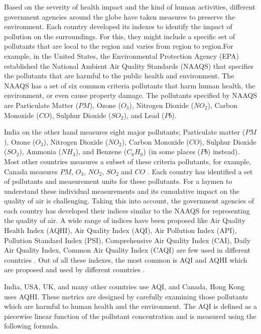 Based on the severity of health impact and the kind of human activities, different government agencies around the globe have taken measures to preserve the environment. Each country developed its indexes to identify the impact of pollution on the surroundings. For this, they might include a specific set of pollutants that are local to the region and varies from region to region.For example, in the United States, the Environmental Protection Agency (EPA) established the National Ambient Air Quality Standards (NAAQS) that specifies the pollutants that are harmful to the public health and environment. The NAAQS has a set of six common criteria pollutants that harm human health, the environment, or even cause property damage. The pollutants specified by NAAQS are Particulate Matter ($PM$), Ozone ($O_3$),  Nitrogen Dioxide ($NO_2$), Carbon Monoxide ($CO$), Sulphur Dioxide ($SO_2$), and Lead ($Pb$).

India on the other hand measures eight major pollutants; Particulate matter ($PM$), Ozone ($O_3$), Nitrogen Dioxide ($NO_2$), Carbon Monoxide ($CO$), Sulphur Dioxide ($SO_2$), Ammonia ($NH_3$), and Benzene ($C_6H_6$) (in some places ($Pb$) instead). Most other countries measures a subset of these criteria pollutants, for example, Canada measures $PM$, $O_3$, $NO_2$, $SO_2$ and $CO$ \cite{Chen2013}. Each country has identified a set of pollutants and measurement units for these pollutants. %
For a laymen to understand these individual measurements and its cumulative impact on the quality of air is challenging. 
Taking this into account, the government agencies of each country has developed their indices similar to the NAAQS for representing the quality of air. A wide range of indices have been proposed like Air Quality Health Index (AQHI), Air Quality Index (AQI), Air Pollution Index (API), Pollution Standard Index (PSI), Comprehensive Air Quality Index (CAI), Daily Air Quality Index, Common Air Quality Index (CAQI) are few used in different countries \cite{WinNT}. Out of all these indexes, the most common is AQI and AQHI which are proposed and used by different countries \cite{Chen2013}.

India, USA, UK, and many other countries use AQI, and Canada, Hong Kong uses AQHI. These metrics are designed by carefully examining those pollutants which are harmful to human health and the environment.
The AQI is defined as a piecewise linear function of the pollutant concentration \cite{Soni2016} and is measured using the following formula.

